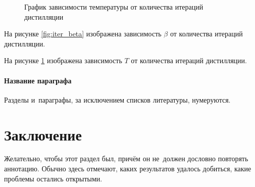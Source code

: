 \documentclass[12pt, twoside]{article}
\begin{document}
\begin{figure}[h]
    \centering
    \caption{График зависимости температуры от количества итераций дистилляции}
    \label{fig:iter_temp}
\end{figure}

На рисунке \ref{fig:iter_beta} изображена зависимость $\beta$ от количества итераций дистилляции.

На рисунке \ref{fig:iter_temp} изображена зависимость $T$ от количества итераций дистилляции.

\paragraph{Название параграфа}
Разделы и~параграфы, за исключением списков литературы, нумеруются.

\section{Заключение}
Желательно, чтобы этот раздел был, причём он не~должен дословно повторять аннотацию.
Обычно здесь отмечают, каких результатов удалось добиться, какие проблемы остались открытыми.






\end{document}
